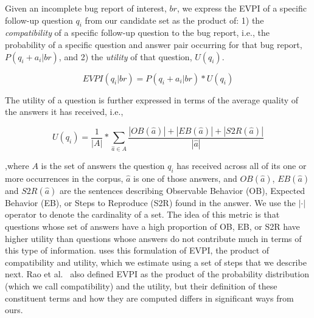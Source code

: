 Given an incomplete bug report of interest, $br$, we express the EVPI of a specific follow-up question $q_{i}$ from our candidate set
as the product of: 1) the {\em compatibility} of a specific follow-up question to the bug report, i.e.,
the probability of a specific question and answer pair occurring for that bug report, $P(q_{i}+a_{i}|br)$, and 2) the {\em utility} of that question, $U(q_{i})$.

$$EVPI(q_{i}|br) = P(q_{i}+a_{i}|br) * U(q_{i})$$

The utility of a question is further expressed in terms of the average quality of the answers it has received, i.e.,

$$U(q_{i}) = \frac{1}{|A|} * \sum_{\hat a \in A}^{} \frac{|OB(\hat a)|+|EB(\hat a)|+|S2R(\hat a)|}{|\hat a|}$$

\noindent
,where $A$ is the set of answers the question $q_{i}$ has received across all of its one or more occurrences in the
corpus, $\hat a$ is one of those answers, and $OB(\hat a)$, $EB(\hat a)$ and $S2R(\hat a)$ are the sentences describing Observable Behavior (OB), Expected Behavior (EB), or
Steps to Reproduce (S2R) found in the answer. We use the $|\cdot|$ operator to denote the cardinality of a set.
The idea of this metric is that questions whose set of answers have a high proportion
of OB, EB, or S2R have higher utility than questions whose answers do not contribute much in
terms of this type of information. \evpi uses this formulation of EVPI, the product of compatibility and utility, which we
estimate using a set of steps that we describe next. Rao et al.~\cite{rao-daume-iii-2018-learning} also defined EVPI as the product of the probability distribution (which we call compatibility) and the utility, but their definition of these constituent terms and how they are computed differs in significant ways from ours.

